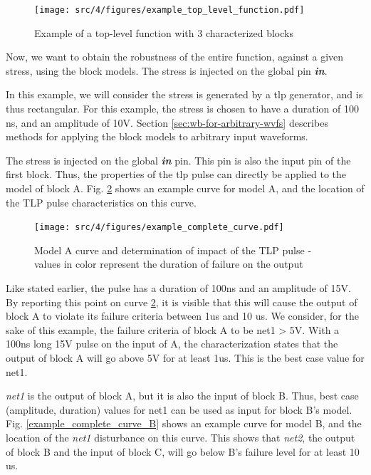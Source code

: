 
\begin{figure}[!htbp]
  \centering
  \texttt{[image: src/4/figures/example\_top\_level\_function.pdf]}
  \caption{Example of a top-level function with 3 characterized blocks}
  \label{example_toplevel_function}
\end{figure}

Now, we want to obtain the robustness of the entire function, against a given stress, using the block models.
The stress is injected on the global pin \textbf{\textit{in}}.

In this example, we will consider the stress is generated by a \gls{tlp} generator, and is thus rectangular.
For this example, the stress is chosen to have a duration of 100 ns, and an amplitude of 10V.
Section \ref{sec:wb-for-arbitrary-wvfs} describes methods for applying the block models to arbitrary input waveforms.

The stress is injected on the global \textbf{\textit{in}} pin.
This pin is also the input pin of the first block.
Thus, the properties of the \gls{tlp} pulse can directly be applied to the model of block A.
Fig. \ref{example_complete_curve} shows an example curve for model A, and the location of the TLP pulse characteristics on this curve.


\begin{figure}[!htbp]
  \centering
  \texttt{[image: src/4/figures/example\_complete\_curve.pdf]}
  \caption{Model A curve and determination of impact of the TLP pulse - values in color represent the duration of failure on the output}
  \label{example_complete_curve}
\end{figure}

Like stated earlier, the pulse has a duration of 100ns and an amplitude of 15V. By reporting this point on curve \ref{example_complete_curve},
it is visible that this will cause the output of block A to violate its failure criteria between 1us and 10 us.
We consider, for the sake of this example, the failure criteria of block A to be net1 > 5V.
With a 100ns long 15V pulse on the input of A, the characterization states that the output of block A will go above 5V for at least 1us.
This is the best case value for net1.

\textit{net1} is the output of block A, but it is also the input of block B.
Thus, best case (amplitude, duration) values for net1 can be used as input for block B's model.
Fig. \ref{example_complete_curve_B} shows an example curve for model B, and the location of the \textit{net1} disturbance on this curve.
This shows that \textit{net2}, the output of block B and the input of block C, will go below B's failure level for at least 10 us.

